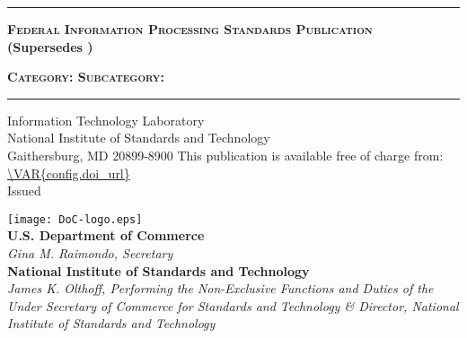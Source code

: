 
\begin{titlepage}


\sffamily

\LARGE{\textbf{}}
\vspace{8pt}
\hrule
\vspace{8pt}
\large{\textbf{\textsc{Federal Information Processing Standards Publication}}}\\
\small{\textbf{(Supersedes )}}

\vfill
\huge{\textbf{}}
\vfill
\normalsize{\textbf{\textsc{Category: 
\hfill Subcategory: 
}}}
\vspace{8pt}
\hrule
\vfill

Information Technology Laboratory\\
National Institute of Standards and Technology\\
Gaithersburg, MD 20899-8900
\vfill
\normalsize This publication is available free of charge from:\\
\url{\VAR{config.doi_url}}\\
\vfill
\normalsize Issued 
\vfill

\texttt{[image: DoC-logo.eps]}\\ 
\vfill
\footnotesize \textbf{U.S. Department of Commerce}\\ 
\textit{Gina M. Raimondo, Secretary}\\
\vspace{10pt}
\textbf{National Institute of Standards and Technology}\\ 
\textit{James K. Olthoff, Performing the Non-Exclusive Functions and Duties of the Under Secretary of Commerce for Standards and Technology \& Director, National Institute of Standards and Technology}  
\end{titlepage}
